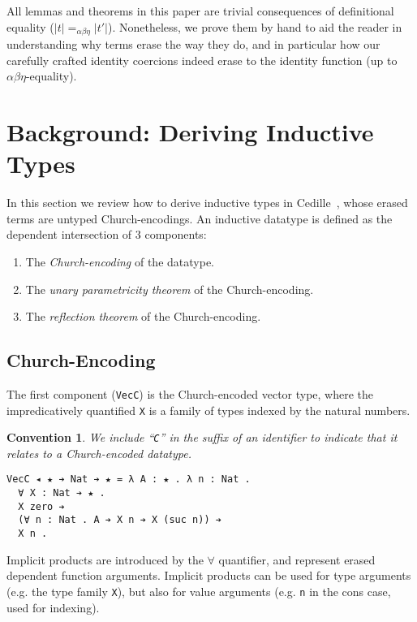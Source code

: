 \documentclass[a4paper,envcountsame,envcountsect]{llncs}
\newtheorem{convention}{Convention}
\newcommand{\labsec}[1]{\label{sec:#1}}
\newcommand{\erase}[1]{\ensuremath{\lvert #1 \rvert}}
\begin{document}
\begin{remark}
  All lemmas and theorems in this paper are trivial consequences of
  definitional equality ($\erase{t} =_{\alpha\beta\eta} \erase{t'}$).
  Nonetheless, we prove them by hand to aid the reader in
  understanding why terms erase the way they do, and in particular how
  our carefully crafted identity coercions indeed erase to the
  identity function (up to $\alpha\beta\eta$-equality).
\end{remark}

\section{Background: Deriving Inductive Types}
\labsec{inductive}

In this section we review how to derive inductive types in
Cedille~\cite{stump17b}, whose erased terms are untyped
Church-encodings.
An inductive datatype is defined as the dependent intersection
of 3 components:
\begin{enumerate}
\item The \textit{Church-encoding} of the datatype.
\item The \textit{unary parametricity theorem} of the Church-encoding.
\item The \textit{reflection theorem} of the Church-encoding.
\end{enumerate}

\subsection{Church-Encoding}
\labsec{ind:church}

The first component (\texttt{VecC}) is the Church-encoded vector type,
where the impredicatively quantified
\texttt{X} is a family of types indexed by the natural numbers.

\begin{convention}
We include ``\texttt{C}'' in
the suffix of an identifier to indicate that it relates to
a Church-encoded datatype.
\end{convention}

\begin{verbatim}
VecC ◂ ★ ➔ Nat ➔ ★ = λ A : ★ . λ n : Nat . 
  ∀ X : Nat ➔ ★ .
  X zero ➔
  (∀ n : Nat . A ➔ X n ➔ X (suc n)) ➔
  X n .
\end{verbatim}

Implicit products are introduced by the $\forall$ quantifier, and
represent erased dependent function arguments.
Implicit products can be used for type arguments (e.g. the type family
\texttt{X}), but also for value arguments
(e.g. \texttt{n} in the cons case, used for indexing).
\end{document}
